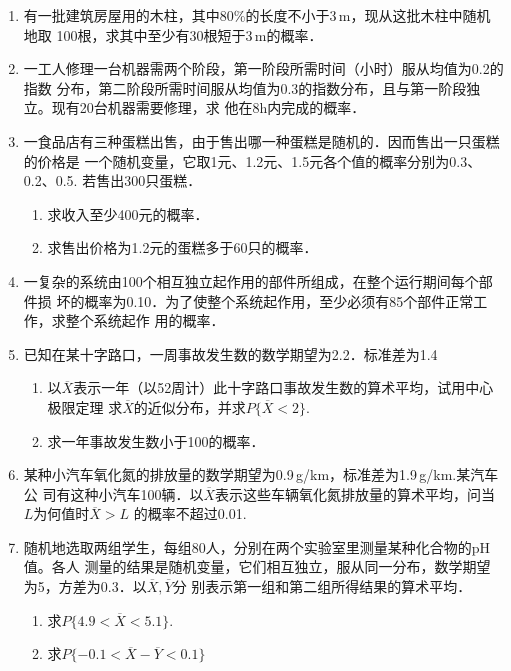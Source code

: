 \documentclass[10pt,a4paper]{article}
\begin{document}
\begin{enumerate}
    \item 有一批建筑房屋用的木柱，其中80\%的长度不小于3$\, $m，现从这批木柱中随机地取
    100根，求其中至少有30根短于3$\, $m的概率．
    \clearpage


    \item 一工人修理一台机器需两个阶段，第一阶段所需时间（小时）服从均值为0.2的指数
    分布，第二阶段所需时间服从均值为0.3的指数分布，且与第一阶段独立。现有20台机器需要修理，求
    他在8h内完成的概率．
    \clearpage



    \item 一食品店有三种蛋糕出售，由于售出哪一种蛋糕是随机的．因而售出一只蛋糕的价格是
    一个随机变量，它取1元、1.2元、1.5元各个值的概率分别为0.3、0.2、0.5. 若售出300只蛋糕．
    \begin{enumerate}
        \item 求收入至少400元的概率．
        \item 求售出价格为1.2元的蛋糕多于60只的概率．
    \end{enumerate}
    \clearpage



    \item 一复杂的系统由100个相互独立起作用的部件所组成，在整个运行期间每个部件损
    坏的概率为0.10．为了使整个系统起作用，至少必须有85个部件正常工作，求整个系统起作
    用的概率．
    \clearpage



    \item 已知在某十字路口，一周事故发生数的数学期望为2.2．标准差为1.4
    \begin{enumerate}
        \item 以$\overline{X}$表示一年（以52周计）此十字路口事故发生数的算术平均，试用中心极限定理
        求$\overline{X}$的近似分布，并求$P\{\overline{X}<2\}$.
        \item 求一年事故发生数小于100的概率．
    \end{enumerate}
    \clearpage





    \item 某种小汽车氧化氮的排放量的数学期望为0.9$\, $g/km，标准差为1.9$\, $g/km.某汽车公
    司有这种小汽车100辆．以$\overline{X}$表示这些车辆氧化氮排放量的算术平均，问当$L$为何值时$\overline{X}>L$
    的概率不超过0.01.
    \clearpage



    \item 随机地选取两组学生，每组80人，分别在两个实验室里测量某种化合物的pH值。各人
    测量的结果是随机变量，它们相互独立，服从同一分布，数学期望为5，方差为0.3．以$\overline{X},\overline{Y}$分
    别表示第一组和第二组所得结果的算术平均．
    \begin{enumerate}
        \item 求$P\{4.9<\overline{X}<5.1\}$.
        \item 求$P\{-0.1<\overline{X}-\overline{Y}<0.1\}$
    \end{enumerate}
    \clearpage




\end{enumerate}
\end{document}
